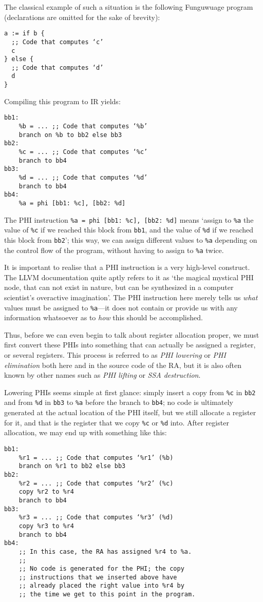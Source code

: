 \documentclass[12pt]{report}
\newcommand{\langname}{Funguwuage}
\begin{document}
The classical example of such a situation is the following \langname{} program (declarations are omitted for the sake of brevity):
\begin{Verbatim}
a := if b {
  ;; Code that computes ‘c’
  c
} else {
  ;; Code that computes ‘d’
  d
}
\end{Verbatim}

\noindent Compiling this program to IR yields:
\begin{Verbatim}
bb1:
    %b = ... ;; Code that computes ‘%b’
    branch on %b to bb2 else bb3
bb2:
    %c = ... ;; Code that computes ‘%c’
    branch to bb4
bb3:
    %d = ... ;; Code that computes ‘%d’
    branch to bb4
bb4:
    %a = phi [bb1: %c], [bb2: %d]
\end{Verbatim}

\noindent The PHI instruction \verb|%a = phi [bb1: %c], [bb2: %d]| means ‘assign to \verb|%a| the value of \verb|%c| if we reached this block
from \verb|bb1|, and the value of \verb|%d| if we reached this block from \verb|bb2|’; this way, we can assign different values to \verb|%a|
depending on the control flow of the program, without having to assign to \verb|%a| twice.

It is important to realise that a PHI instruction is a very high-level construct. The LLVM documentation quite aptly refers to it as ‘the
magical mystical PHI node, that can not exist in nature, but can be synthesized in a computer scientist's overactive imagination’. The PHI
instruction here merely tells us \textit{what} values must be assigned to \verb|%a|—it does not contain or provide us with any information
whatsoever as to \textit{how} this should be accomplished.

Thus, before we can even begin to talk about register allocation proper, we must first convert these PHIs into something that can
actually be assigned a register, or several registers. This process is referred to as \textit{PHI lowering} or \textit{PHI elimination}
both here and in the source code of the RA, but it is also often known by other names such as \textit{PHI lifting} or \textit{SSA
destruction}.

Lowering PHIs seems simple at first glance: simply insert a copy from \verb|%c| in \verb|bb2| and from \verb|%d| in \verb|bb3| to
\verb|%a| before the branch to \verb|bb4|; no code is ultimately generated at the actual location of the PHI itself, but we
still allocate a register for it, and that is the register that we copy \verb|%c| or \verb|%d| into. After register allocation, we may
end up with something like this:
\begin{Verbatim}
bb1:
    %r1 = ... ;; Code that computes ‘%r1’ (%b)
    branch on %r1 to bb2 else bb3
bb2:
    %r2 = ... ;; Code that computes ‘%r2’ (%c)
    copy %r2 to %r4
    branch to bb4
bb3:
    %r3 = ... ;; Code that computes ‘%r3’ (%d)
    copy %r3 to %r4
    branch to bb4
bb4:
    ;; In this case, the RA has assigned %r4 to %a.
    ;;
    ;; No code is generated for the PHI; the copy
    ;; instructions that we inserted above have
    ;; already placed the right value into %r4 by
    ;; the time we get to this point in the program.
\end{Verbatim}
\end{document}
